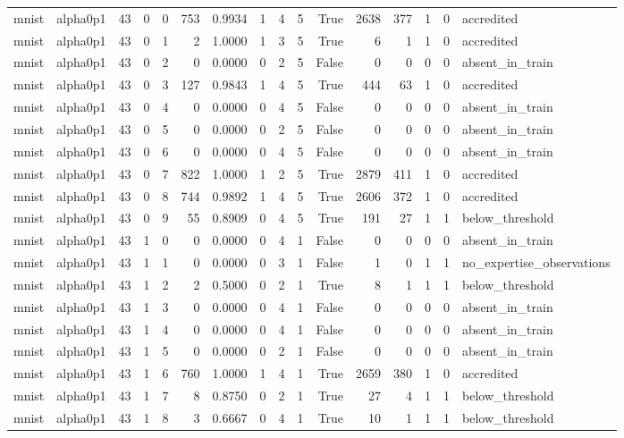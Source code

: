 \begin{tabular}{llrrrrrrrrrrrrrl}
mnist & alpha0p1 & 43 & 0 & 0 & 753 & 0.9934 & 1 & 4 & 5 & True & 2638 & 377 & 1 & 0 & accredited \\
mnist & alpha0p1 & 43 & 0 & 1 & 2 & 1.0000 & 1 & 3 & 5 & True & 6 & 1 & 1 & 0 & accredited \\
mnist & alpha0p1 & 43 & 0 & 2 & 0 & 0.0000 & 0 & 2 & 5 & False & 0 & 0 & 0 & 0 & absent\_in\_train \\
mnist & alpha0p1 & 43 & 0 & 3 & 127 & 0.9843 & 1 & 4 & 5 & True & 444 & 63 & 1 & 0 & accredited \\
mnist & alpha0p1 & 43 & 0 & 4 & 0 & 0.0000 & 0 & 4 & 5 & False & 0 & 0 & 0 & 0 & absent\_in\_train \\
mnist & alpha0p1 & 43 & 0 & 5 & 0 & 0.0000 & 0 & 2 & 5 & False & 0 & 0 & 0 & 0 & absent\_in\_train \\
mnist & alpha0p1 & 43 & 0 & 6 & 0 & 0.0000 & 0 & 4 & 5 & False & 0 & 0 & 0 & 0 & absent\_in\_train \\
mnist & alpha0p1 & 43 & 0 & 7 & 822 & 1.0000 & 1 & 2 & 5 & True & 2879 & 411 & 1 & 0 & accredited \\
mnist & alpha0p1 & 43 & 0 & 8 & 744 & 0.9892 & 1 & 4 & 5 & True & 2606 & 372 & 1 & 0 & accredited \\
mnist & alpha0p1 & 43 & 0 & 9 & 55 & 0.8909 & 0 & 4 & 5 & True & 191 & 27 & 1 & 1 & below\_threshold \\
mnist & alpha0p1 & 43 & 1 & 0 & 0 & 0.0000 & 0 & 4 & 1 & False & 0 & 0 & 0 & 0 & absent\_in\_train \\
mnist & alpha0p1 & 43 & 1 & 1 & 0 & 0.0000 & 0 & 3 & 1 & False & 1 & 0 & 1 & 1 & no\_expertise\_observations \\
mnist & alpha0p1 & 43 & 1 & 2 & 2 & 0.5000 & 0 & 2 & 1 & True & 8 & 1 & 1 & 1 & below\_threshold \\
mnist & alpha0p1 & 43 & 1 & 3 & 0 & 0.0000 & 0 & 4 & 1 & False & 0 & 0 & 0 & 0 & absent\_in\_train \\
mnist & alpha0p1 & 43 & 1 & 4 & 0 & 0.0000 & 0 & 4 & 1 & False & 0 & 0 & 0 & 0 & absent\_in\_train \\
mnist & alpha0p1 & 43 & 1 & 5 & 0 & 0.0000 & 0 & 2 & 1 & False & 0 & 0 & 0 & 0 & absent\_in\_train \\
mnist & alpha0p1 & 43 & 1 & 6 & 760 & 1.0000 & 1 & 4 & 1 & True & 2659 & 380 & 1 & 0 & accredited \\
mnist & alpha0p1 & 43 & 1 & 7 & 8 & 0.8750 & 0 & 2 & 1 & True & 27 & 4 & 1 & 1 & below\_threshold \\
mnist & alpha0p1 & 43 & 1 & 8 & 3 & 0.6667 & 0 & 4 & 1 & True & 10 & 1 & 1 & 1 & below\_threshold \\

\end{tabular}

